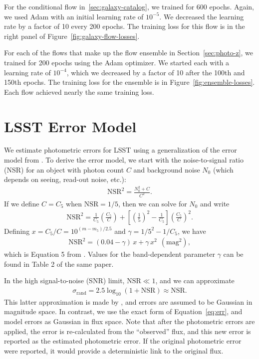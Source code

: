\documentclass[twocolumn,twocolappendix]{aastex631}
\begin{document}
For the conditional flow in~\ref{sec:galaxy-catalog}, we trained for 600 epochs.
Again, we used Adam with an initial learning rate of $10^{-5}$.
We decreased the learning rate by a factor of 10 every 200 epochs.
The training loss for this flow is in the right panel of Figure~\ref{fig:galaxy-flow-losses}.

For each of the flows that make up the flow ensemble in Section~\ref{sec:photo-z}, we trained for 200 epochs using the Adam optimizer.
We started each with a learning rate of $10^{-4}$, which we decreased by a factor of 10 after the 100th and 150th epochs.
The training loss for the ensemble is in Figure~\ref{fig:ensemble-losses}.
Each flow achieved nearly the same training loss.


\section{LSST Error Model}
\label{app:error-model}

We estimate photometric errors for LSST using a generalization of the error model from \citet{ivezic2019}.
To derive the error model, we start with the noise-to-signal ratio (NSR) for an object with photon count $C$ and background noise $N_0$ (which depends on seeing, read-out noise, etc.):
\begin{align}
    \text{NSR}^2 = \frac{N_0^2 + C}{C^2}.
\end{align}
If we define $C=C_5$ when $\text{NSR}= 1/5$, then we can solve for $N_0$ and write
\begin{align}
    \text{NSR}^2 = \frac{1}{C_5} \left( \frac{C_5}{C} \right) + \left[ \left( \frac{1}{5} \right)^2 - \frac{1}{C_5} \right] \left( \frac{C_5}{C} \right)^2.
\end{align}
Defining $x = C_5/C = 10^{(m-m_5)/2.5}$ and $\gamma = 1/5^2 - 1/C_5$, we have
\begin{align}
    \text{NSR}^2 = (0.04 - \gamma) \, x + \gamma \, x^2 ~~ (\text{mag}^2),
\end{align}
which is Equation 5 from \citet{ivezic2019}.
Values for the band-dependent parameter $\gamma$ can be found in Table 2 of the same paper.

In the high signal-to-noise (SNR) limit, $\text{NSR} \ll 1$, and we can approximate
\begin{align}
    \sigma_\text{rand} = 2.5 \log_{10}(1 + \text{NSR}) \approx \text{NSR}.
    \label{eq:err}
\end{align}
This latter approximation is made by \citet{ivezic2019}, and errors are assumed to be Gaussian in magnitude space.
In contrast, we use the exact form of Equation~\ref{eq:err}, and model errors as Gaussian in flux space.
Note that after the photometric errors are applied, the error is re-calculated from the ``observed'' flux, and this new error is reported as the estimated photometric error.
If the original photometric error were reported, it would provide a deterministic link to the original flux.
\end{document}
